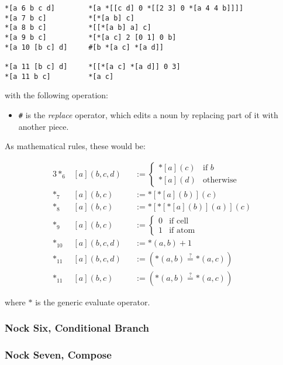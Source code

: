 \begin{lstlisting}[style=nonumbers]
*[a 6 b c d]        *[a *[[c d] 0 *[[2 3] 0 *[a 4 4 b]]]]
*[a 7 b c]          *[*[a b] c]
*[a 8 b c]          *[[*[a b] a] c]
*[a 9 b c]          *[*[a c] 2 [0 1] 0 b]
*[a 10 [b c] d]     #[b *[a c] *[a d]]

*[a 11 [b c] d]     *[[*[a c] *[a d]] 0 3]
*[a 11 b c]         *[a c]
\end{lstlisting}

with the following operation:

\begin{itemize}
  \item  \texttt{\#} is the \emph{replace} operator, which edits a noun by replacing part of it with another piece.
\end{itemize}

As mathematical rules, these would be:

\begin{alignat*}{3}
*_{6}&[a](b,c,d) &&:= \left\{ \begin{matrix} *[a](c) & \textrm{if } b \\ *[a](d) & \textrm{otherwise} \end{matrix} \right. \\
*_{7}&[a](b,c) &&:= *[*[a](b)](c) \\
*_{8}&[a](b,c) &&:= *[*[*[a](b)](a)](c) \\  %
*_{9}&[a](b,c) &&:= \left\{\begin{matrix} 0 & \text{if cell} \\ 1 & \text{if atom} \end{matrix} \right. \\
*_{10}&[a](b,c,d) &&:= {*(a,b) + 1} \\
*_{11}&[a](b,c,d) &&:= ({*(a,b)} \stackrel{?}{=} {*(a,c)}) \\
*_{11}&[a](b,c) &&:= ({*(a,b)} \stackrel{?}{=} {*(a,c)})
\end{alignat*}

where $*$ is the generic evaluate operator.

\subsubsection[Nock Six]{Nock Six, Conditional Branch}
\subsubsection[Nock Seven]{Nock Seven, Compose}
